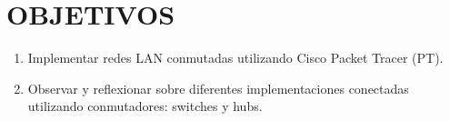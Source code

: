 \chapter{OBJETIVOS}

\begin{caja}[]
\begin{enumerate}[label=\itembolasazules{}]
\item Implementar redes LAN conmutadas utilizando Cisco Packet Tracer (PT).
\item Observar y reflexionar sobre diferentes implementaciones conectadas utilizando conmutadores: switches y hubs.
\end{enumerate}
\end{caja}